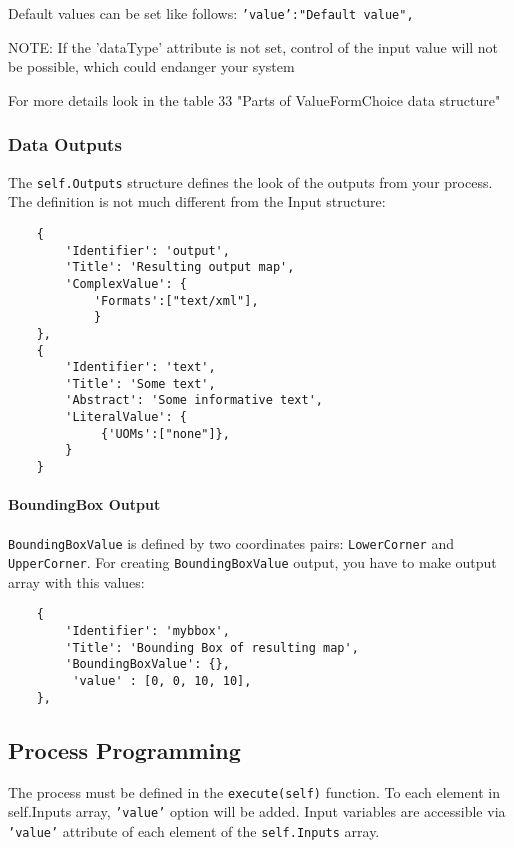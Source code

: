 \documentclass[a4paper,11pt]{article}
\begin{document}
     
    Default values can be set like follows: \texttt{'value':"Default value",}

    NOTE: If the 'dataType' attribute is not set, control of the input value
    will not be possible, which could endanger your system
     
    For more details look in the table 33 "Parts of ValueFormChoice data
    structure"


    \subsubsection{Data Outputs}
     
    The \texttt{self.Outputs} structure defines the look of the outputs from your process.
    The definition is not much different from the Input structure:
     

    \begin{verbatim}
    {
        'Identifier': 'output',
        'Title': 'Resulting output map',
        'ComplexValue': {
            'Formats':["text/xml"],
            }
    },
    {
        'Identifier': 'text',
        'Title': 'Some text',
        'Abstract': 'Some informative text',
        'LiteralValue': {
             {'UOMs':["none"]},
        }
    }
    \end{verbatim}

    \paragraph{BoundingBox Output}
    \texttt{BoundingBoxValue} is defined by two coordinates pairs:
    \texttt{LowerCorner} and \texttt{UpperCorner}. For creating
    \texttt{BoundingBoxValue}    output, you have to make output array with this
    values:
    \begin{verbatim}
    {
        'Identifier': 'mybbox',
        'Title': 'Bounding Box of resulting map',
        'BoundingBoxValue': {},
         'value' : [0, 0, 10, 10],
    },
    \end{verbatim}


    \subsection{Process Programming}
     
    The process must be defined in the \texttt{execute(self)} function. To
    each element in self.Inputs array, \texttt{'value'} option will be added.
    Input variables are accessible via \texttt{'value'} attribute of each element of the
    \texttt{self.Inputs} array. 
\end{document}
